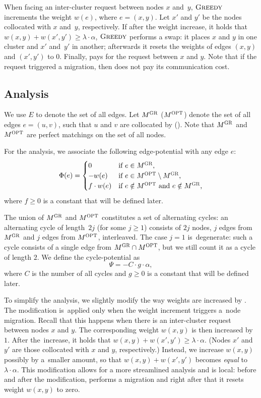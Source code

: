When facing an inter-cluster request between nodes $x$
and~$y$, $\textsc{Greedy}$ increments the weight $w(e)$, where $e = (x,y)$. Let $x'$
and $y'$ be the nodes collocated with $x$ and~$y$, respectively. If after the
weight increase, it holds that $w(x,y) + w(x',y') \geq \lambda
\cdot \alpha$, $\textsc{Greedy}$ performs a swap: it places $x$ and $y$ in one
cluster and $x'$ and~$y'$ in another; afterwards it resets the weights of
edges $(x,y)$ and $(x',y')$ to 0. Finally, \GREEDY pays for the request
between $x$ and $y$. Note that if the request triggered a migration, then
\GREEDY does not pay its communication cost.


\subsection{Analysis}

We use $E$ to denote the set of all edges.
Let $M^\textsc{GR}$ ($M^\textsc{OPT}$) denote the set of all edges $e = (u,v)$, such 
that $u$ and $v$ are collocated by \GREEDY (\OPT). 
Note that $M^\textsc{GR}$ and $M^\textsc{OPT}$ are perfect matchings on the set of all nodes.

For the analysis, we associate the following edge-potential with any edge $e$:
\[
	\Phi(e) = \begin{cases}
		0 			& \textrm{if $e \in M^\textsc{GR}$,} \\
		- w(e) 	& \textrm{if $e \in M^\textsc{OPT} \setminus M^\textsc{GR}$,} \\
		f \cdot w(e) & \textrm{if $e \notin M^\textsc{OPT}$ and $e \notin M^\textsc{GR}$,} \\
	\end{cases}
\]
where $f \geq 0$ is a constant that will be defined later. 

The union of $M^\textsc{GR}$ and $M^\textsc{OPT}$ constitutes a set of alternating cycles:
an alternating cycle of length~$2 j$ (for some $j \geq 1$) consists of $2 j$
nodes, $j$ edges from $M^\textsc{GR}$ and $j$ edges from $M^\textsc{OPT}$, interleaved. The
case $j = 1$ is~degenerate: such a cycle consists of a single edge from $M^\textsc{GR}
\cap M^\textsc{OPT}$, but we still count it as a cycle of length $2$. We define the
cycle-potential as
\[
	\Psi = - C \cdot g \cdot \alpha,
\]
where $C$ is the number of all cycles and $g \geq 0$ is a constant that will
be defined later.

To simplify the analysis, we slightly modify the way weights are increased by
\GREEDY. The modification is~applied only when the weight increment triggers 
a~node migration. Recall that this happens when there is an inter-cluster
request between nodes $x$ and $y$. The corresponding weight $w(x,y)$ is then
increased by $1$. After the~increase, it holds that $w(x,y) + w(x',y') \geq
\lambda \cdot \alpha$. (Nodes $x'$ and $y'$ are those collocated with $x$ and $y$,
respectively.) Instead, we increase $w(x,y)$ possibly by a~smaller amount, so
that $w(x,y) + w(x',y')$ becomes \emph{equal} to $\lambda \cdot \alpha$. This
modification allows for a more streamlined analysis and is local: before and
after the modification, \GREEDY performs a migration and right after that
it resets weight $w(x,y)$ to zero.

